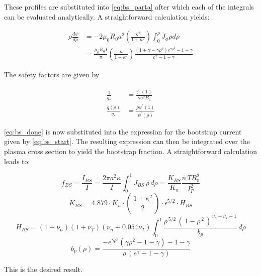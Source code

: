 These profiles are substituted into \cref{eq:bs_parta} after which each of the integrals can be evaluated analytically. A straightforward calculation yields:

\begin{equation}
\label{eq:bs_done}
\begin{aligned} \rho \frac { d \psi } { d \rho } & = - 2 \mu _ { 0 } R _ { 0 } a ^ { 2 } \left( \frac { \kappa ^ { 2 } } { 1 + \kappa ^ { 2 } } \right) \int _ { 0 } ^ { \rho } \overline { J } _ { \phi } \rho d \rho \\ & = \frac { \mu _ { 0 } R _ { 0 } I } { \pi } \left( \frac { \kappa } { 1 + \kappa ^ { 2 } } \right) \frac { \left( 1 + \gamma - \gamma \rho ^ { 2 } \right) e ^ { \gamma \rho ^ { 2 } } - 1 - \gamma } { e ^ { \gamma } - 1 - \gamma } \end{aligned}
\end{equation}

The safety factors are given by

\begin{equation}
\begin{aligned} \frac { 1 } { q _ { * } } & = \frac { \psi ^ { \prime } ( 1 ) } { \kappa a ^ { 2 } B _ { 0 } } \\ \frac { q ( \rho ) } { q _ { * } } & = \frac { \rho \psi ^ { \prime } ( 1 ) } { \psi ^ { \prime } ( \rho ) } \end{aligned}
\end{equation}

\cref{eq:bs_done} is now substituted into the expression for the bootstrap current given by \cref{eq:bs_start}. The resulting expression can then be integrated over the plasma cross section to yield the bootstrap fraction. A straightforward calculation leads to:

\begin{equation}
	f_{BS} = \frac{I_{BS}}{I} = \frac{ 2 \pi a^2 \kappa }{I} \int_0^1 J_{BS} \, \rho \, d\rho = \frac{ K_{BS} }{ K_n } \frac{\overline n \, \overline T R_0^2}{I_P^2}
\end{equation}
\begin{equation}
  K_{BS} = 4.879 \cdot  K_n \cdot \left( \, \frac{1+\kappa^2}{2} \, \right) \cdot \epsilon^{5/2} \cdot H_{BS}
\end{equation}
\begin{equation}
  H_{BS} = ( 1 + \nu_n ) ( 1 + \nu_T ) ( \nu_n + 0.054 \nu_T ) \int_0^1 \frac{ \rho^{\,5/2} \, ( \, 1 - \rho^{\,2} \, )^{\, \nu_n + \nu_T - 1} }{b_p} \, d\rho
\end{equation}
\begin{equation}
	b_p(\rho) = \frac{ -e^{\gamma\rho^2} ( \gamma\rho^2 - 1 - \gamma ) - 1 - \gamma }{\rho \,( e^\gamma - 1 - \gamma ) }
\end{equation}

This is the desired result.
